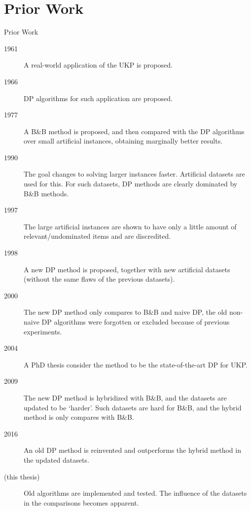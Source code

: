 \documentclass{beamer}
\begin{document}
\section{Prior Work}
\begin{frame}[allowframebreaks]{Prior Work}
\begin{description}
\item[1961] A real-world application of the UKP is proposed.\cite{gg-61} %
\item[1966] DP algorithms for such application are proposed.\cite{gg-66} %
\item[1977] A B\&B method is proposed, and then compared with the DP algorithms over small artificial instances, obtaining marginally better results.\cite{mtu1} %
\item[1990] The goal changes to solving larger instances faster. Artificial datasets are used for this. For such datasets, DP methods are clearly dominated by B\&B methods.\cite{mtu2}
\item[1997] The large artificial instances are shown to have only a little amount of relevant/undominated items and are discredited.\cite{zhu_dominated}
\item[1998] A new DP method is proposed, together with new artificial datasets (without the same flaws of the previous datasets).\cite{ukp_new_results}
\item[2000] The new DP method only compares to B\&B and naive DP, the old non-naive DP algorithms were forgotten or excluded because of previous experiments.\cite{eduk}
\item[2004] A PhD thesis consider the method to be the state-of-the-art DP for UKP.\cite{book_ukp_2004}
\item[2009] The new DP method is hybridized with B\&B, and the datasets are updated to be `harder'. Such datasets are hard for B\&B, and the hybrid method is only compares with B\&B.\cite{pya} %
\item[2016] An old DP method is reinvented and outperforms the hybrid method in the updated datasets.\cite{sea2016}
\item[(this thesis)] Old algorithms are implemented and tested. The influence of the datasets in the comparisons becomes apparent.
\end{description}
\end{frame}
\end{document}
